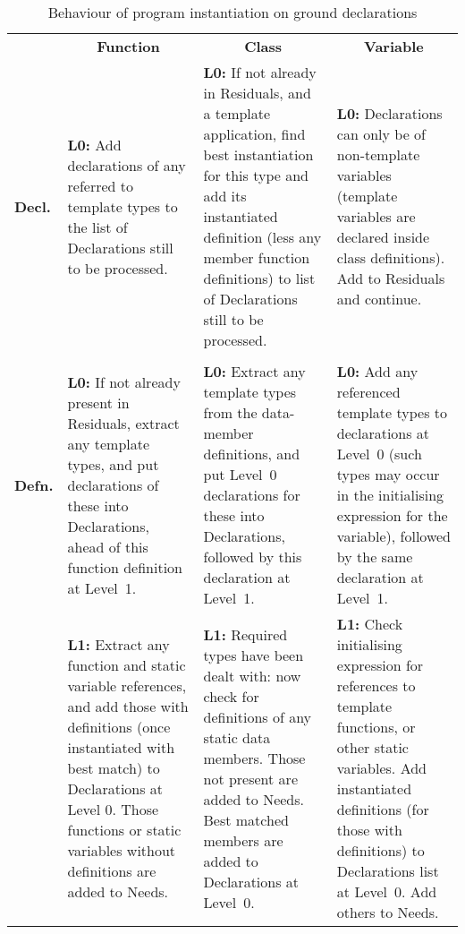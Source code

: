 \documentclass[11pt]{article}
\begin{document}
\begin{table}
\hspace{-3em}
\begin{tabular}{lp{}p{}p{}}
  & \multicolumn{1}{c}{\textbf{Function}} &
  \multicolumn{1}{c}{\textbf{Class}} &
  \multicolumn{1}{c}{\textbf{Variable}} \\
  \textbf{Decl.}
  &
  \small \textbf{L0:}
  Add declarations of any referred to template types
  to the list of Declarations still to be processed.
  &
  \small \textbf{L0:}
  If not already in Residuals, and a template application, find best
  instantiation for this type and add its instantiated definition
  (less any member function definitions) to
  list of Declarations still to be processed.
  &
  \small \textbf{L0:} Declarations can only be of non-template variables
  (template variables are declared inside class definitions).  Add to
  Residuals and continue.
  \\ \\
  \textbf{Defn.}
  &
  \small\textbf{L0:} If not already present in Residuals, extract any
  template
  types, and put declarations of
  these into Declarations, ahead of this function definition at
  Level~1.
  &
  \small \textbf{L0:} Extract any template types from the data-member
  definitions, and put Level~0 declarations for these into
  Declarations, followed by this declaration at Level~1.
  &
  \small \textbf{L0:} Add any referenced template types to
  declarations at Level~0 (such types may occur in the initialising
  expression for the variable), followed by the same declaration at
  Level~1.
  \\[1ex]
  &
  \small \textbf{L1:} Extract any function and static
  variable references, and
  add those with definitions (once instantiated with best match)  to
  Declarations at Level 0.  Those
  functions or static variables without definitions are added to
  Needs.
  &
  \small \textbf{L1:}
  Required types have been dealt with: now check for definitions of
  any static data members.  Those not present are added to Needs.
  Best matched members are added to Declarations at Level~0.
  &
  \small \textbf{L1:} Check initialising expression for references to
  template functions, or other static variables.  Add instantiated
  definitions (for those with definitions) to
  Declarations list at Level~0.  Add others to Needs.
\end{tabular}
\caption{Behaviour of program instantiation on ground declarations}
\label{tab:ground-decls}
\end{table}
\end{document}
